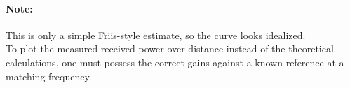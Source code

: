 \paragraph{Note:}
This is only a simple Friis-style estimate, so the curve looks idealized. \\To plot the measured received power over distance instead of the theoretical calculations, one must possess the correct gains against a known reference at a matching frequency.

\newpage


